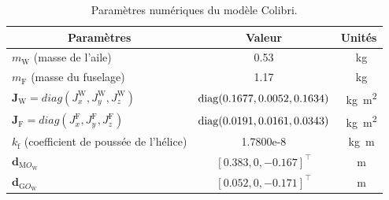 \begin{table}[ht]
  \centering
    \begin{tabular}{|l|c|c|}
      \hline
      \multicolumn{1}{|c|}{Paramètres} & Valeur & Unités  \\
      \hline
      $m_{\text{W}}$ (masse de l'aile)  & 0.53& \SI{}{\kilogram} \\
      \hline
      $m_{\text{F}}$ (masse du fuselage)  & 1.17& \SI{}{\kilogram} \\
      \hline
      $\boldsymbol{J}_{\text{W}}=diag(J_{x}^{\text{W}}, J_{y}^{\text{W}}, J_{z}^{\text{W}})$ & \!\! $\operatorname{diag}(0.1677,0.0052,0.1634)$\!\! & \SI{}{\kilogram\square\meter}\\
      \hline
      $\boldsymbol{J}_{\text{F}}=diag(J_{x}^{\text{F}}, J_{y}^{\text{F}}, J_{z}^{\text{F}})$ & \!\! $\operatorname{diag}(0.0191,0.0161,0.0343)$\!\! & \SI{}{\kilogram\square\meter}\\
      \hline
      $k_{\text{f}}$ (coefficient de poussée de l'hélice) & 1.7800e-8 & \SI{}{\kilogram\meter}\\
      \hline
       $\boldsymbol{d}_{\text{M}O_{\text{W}}}$  & $[0.383,0,-0.167]^\top$ & \SI{}{\meter}\\
      \hline
       $\boldsymbol{d}_{\text{G}O_{\text{W}}}$  & $[0.052,0,-0.171]^\top$ & \SI{}{\meter}\\
      \hline
    \end{tabular}
    \caption{Paramètres numériques du modèle Colibri.}
    \label{tab:pars_colibri}
\end{table}

